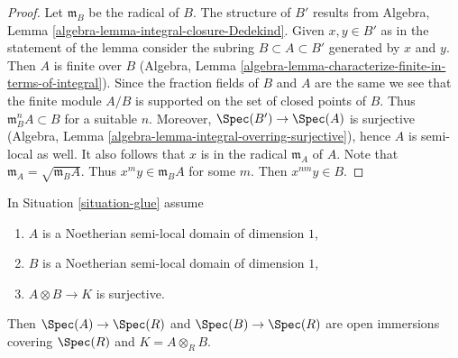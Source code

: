 \begin{proof}
Let $\mathfrak m_B$ be the radical of $B$. The structure of $B'$ results from
Algebra, Lemma \ref{algebra-lemma-integral-closure-Dedekind}.
Given $x, y \in B'$ as in the statement of the lemma consider
the subring $B \subset A \subset B'$ generated by $x$ and $y$.
Then $A$ is finite over $B$ (Algebra, Lemma
\ref{algebra-lemma-characterize-finite-in-terms-of-integral}).
Since the fraction fields of $B$ and $A$ are the same we see
that the finite module $A/B$ is supported on the set of
closed points of $B$. Thus $\mathfrak m_B^n A \subset B$ for
a suitable $n$. Moreover, $\Spec(B') \to \Spec(A)$ is
surjective (Algebra, Lemma \ref{algebra-lemma-integral-overring-surjective}),
hence $A$ is semi-local as well. It also follows that
$x$ is in the radical $\mathfrak m_A$ of $A$. Note that
$\mathfrak m_A = \sqrt{\mathfrak m_B A}$.
Thus $x^m y \in \mathfrak m_B A$ for some $m$.
Then $x^{nm} y \in B$.
\end{proof}

\begin{lemma}
\label{lemma-semi-local-both-side}
In Situation \ref{situation-glue} assume
\begin{enumerate}
\item $A$ is a Noetherian semi-local domain of dimension $1$,
\item $B$ is a Noetherian semi-local domain of dimension $1$,
\item $A \otimes B \to K$ is surjective.
\end{enumerate}
Then $\Spec(A) \to \Spec(R)$ and $\Spec(B) \to \Spec(R)$
are open immersions covering $\Spec(R)$ and $K = A \otimes_R B$.
\end{lemma}

